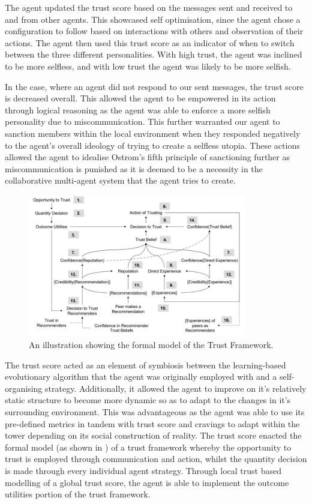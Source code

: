 The agent updated the trust score based on the messages sent and received to and from other agents. This showcased self optimisation, since the agent chose a configuration to follow based on interactions with others and observation of their actions. The agent then used this trust score as an indicator of when to switch between the three different personalities. With high trust, the agent was inclined to be more selfless, and with low trust the agent was likely to be more selfish.

In the case, where an agent did not respond to our sent messages, the trust score is decreased overall. This allowed the agent to be empowered in its action through logical reasoning as the agent was able to enforce a more selfish personality due to miscommunication. This further warranted our agent to sanction members within the local environment when they responded negatively to the agent's overall ideology of trying to create a selfless utopia. These actions allowed the agent to idealise Ostrom's fifth principle of sanctioning further as miscommunication is punished as it is deemed to be a necessity in the collaborative multi-agent system that the agent tries to create.

\begin{figure}[htb]
    \centering
    \includegraphics[width=0.85\textwidth]{006_team_4_agent_design/assets/JeremyPittTrustFramework.jpg}
    \caption{An illustration showing the formal model of the Trust Framework. \cite{JeremyPittSlides}}
    \label{fig:TrustFramework}
\end{figure}

The trust score acted as an element of symbiosis between the learning-based evolutionary algorithm that the agent was originally employed with and a self-organising strategy. Additionally, it allowed the agent to improve on it's relatively static structure to become more dynamic so as to adapt to the changes in it's surrounding environment. This was advantageous as the agent was able to use its pre-defined metrics in tandem with trust score and cravings to adapt within the tower depending on its social construction of reality. The trust score enacted the formal model (as shown in ) of a trust framework whereby the opportunity to trust is employed through communication and action, whilst the quantity decision is made through every individual agent strategy. Through local trust based modelling of a global trust score, the agent is able to implement the outcome utilities portion of the trust framework.

